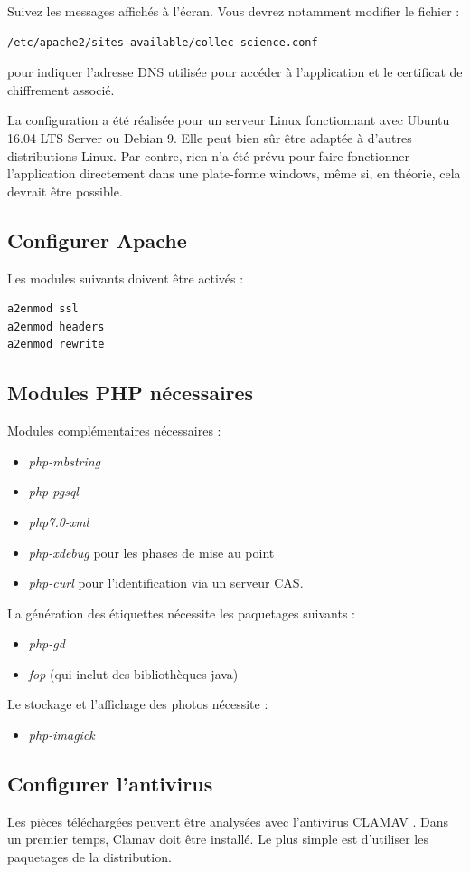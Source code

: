 Suivez les messages affichés à l'écran. Vous devrez notamment modifier le fichier :
\begin{lstlisting}
/etc/apache2/sites-available/collec-science.conf 
\end{lstlisting}
pour indiquer l'adresse DNS utilisée pour accéder à l'application et le certificat de chiffrement associé.

La configuration a été réalisée pour un serveur Linux fonctionnant avec Ubuntu 16.04 LTS Server ou Debian 9. Elle peut bien sûr être adaptée à d'autres distributions Linux. Par contre, rien n'a été prévu pour faire fonctionner l'application directement dans une plate-forme windows, même si, en théorie, cela devrait être possible.

\subsection{Configurer Apache}
Les modules suivants doivent être activés :
\begin{lstlisting}
a2enmod ssl
a2enmod headers
a2enmod rewrite
\end{lstlisting}
\subsection{Modules PHP nécessaires}
Modules complémentaires nécessaires :
\begin{itemize}
\item \textit{php-mbstring}
\item \textit{php-pgsql}
\item \textit{php7.0-xml} 
\item \textit{php-xdebug} pour les phases de mise au point
\item \textit{php-curl} pour l'identification via un serveur CAS.
\end{itemize}
La génération des étiquettes nécessite les paquetages suivants :
\begin{itemize}
\item \textit{php-gd} 
\item \textit{fop} (qui inclut des bibliothèques java)
\end{itemize}

Le stockage et l'affichage des photos nécessite :
\begin{itemize}
\item \textit{php-imagick}
\end{itemize}


\subsection{Configurer l'antivirus}
Les pièces téléchargées peuvent être analysées avec l'antivirus CLAMAV \cite{clamav}. Dans un premier temps, Clamav doit être installé. Le plus simple est d'utiliser les paquetages de la distribution.

